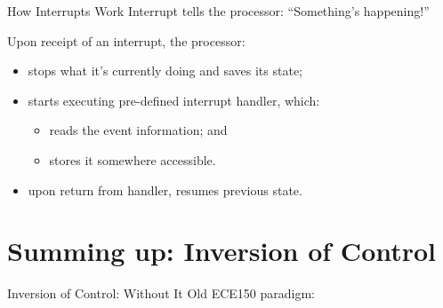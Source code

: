\documentclass[aspectratio=169]{beamer}
\begin{document}
\begin{frame}{How Interrupts Work}
Interrupt tells the processor: ``Something's happening!''\vfill

Upon receipt of an interrupt, the processor:
\begin{itemize}
\item stops what it's currently doing and saves its state;
\item starts executing pre-defined \alert{interrupt handler}, which:
\begin{itemize}
\item reads the event information; and
\item stores it somewhere accessible.
\end{itemize}
\item upon return from handler, resumes previous state.
\end{itemize}
\end{frame}


\section*{Summing up: Inversion of Control}



\begin{frame}{Inversion of Control: Without It}
Old ECE150 paradigm:\\[2em]

\end{frame}
\end{document}
